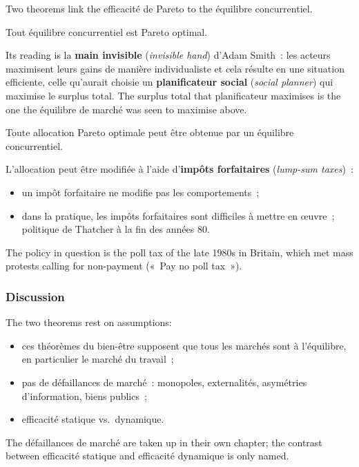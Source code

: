 Two theorems link the efficacité de Pareto to the équilibre concurrentiel.

\begin{theorem}
  Tout équilibre concurrentiel est Pareto optimal.
\end{theorem}

Its reading is la \textbf{main invisible} (\textit{invisible hand}) d'Adam
Smith~: les acteurs maximisent leurs gains de manière individualiste et cela
résulte en une situation efficiente, celle qu'aurait choisie un \textbf{planificateur
social} (\textit{social planner}) qui maximise le surplus total. The surplus total
that planificateur maximises is the one the équilibre de marché was seen to maximise
above.

\begin{theorem}
  Toute allocation Pareto optimale peut être obtenue par un équilibre concurrentiel.
\end{theorem}

L'allocation peut être modifiée à l'aide d'\textbf{impôts forfaitaires}
(\textit{lump-sum taxes})~:
\begin{itemize}
  \item un impôt forfaitaire ne modifie pas les comportements~;
  \item dans la pratique, les impôts forfaitaires sont difficiles à mettre en
    œuvre~; politique de Thatcher à la fin des années 80.
\end{itemize}
The policy in question is the poll tax of the late 1980s in Britain, which met mass
protests calling for non-payment («~Pay no poll tax~»).

\subsubsection{Discussion}

The two theorems rest on assumptions:
\begin{itemize}
  \item ces théorèmes du bien-être supposent que tous les marchés sont à
    l'équilibre, en particulier le marché du travail~;
  \item pas de défaillances de marché~: monopoles, externalités, asymétries
    d'information, biens publics~;
  \item efficacité statique vs.\ dynamique.
\end{itemize}
The défaillances de marché are taken up in their own chapter; the contrast between
efficacité statique and efficacité dynamique is only named.

